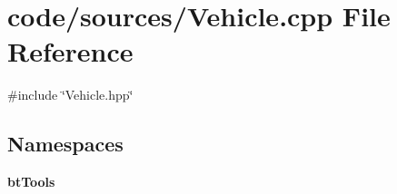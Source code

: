 \section{code/sources/\+Vehicle.cpp File Reference}
\label{_vehicle_8cpp}
{\ttfamily \#include \char`\"{}Vehicle.\+hpp\char`\"{}}\newline
\subsection*{Namespaces}
\begin{DoxyCompactItemize}
\item 
 \textbf{ bt\+Tools}
\end{DoxyCompactItemize}
